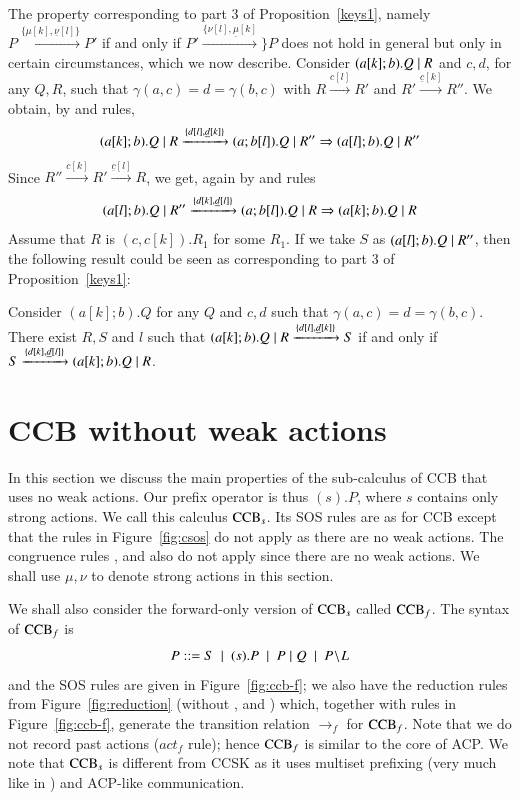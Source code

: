 The property corresponding to part 3 of Proposition~\ref{keys1},
namely $P \xrightarrow{\{\mu[k],\underline{\nu}[l]\}} P'$ if and only if
$P' \xrightarrow{\{\nu[l],\underline{\mu}[k]}\} P$
does not hold in general but only in 
certain circumstances, which we now describe. Consider $(a[k];b).Q \; \vert \; R$ and $c,d$, for any $Q, R$,
such that $\gamma(a,c)=d=\gamma(b,c)$ with
$R\xrightarrow{c[l]} R'$ and $R' \xrightarrow{\underline{c}[k]} R''$. We obtain, by  and  rules,
$$(a[k];b).Q \; \vert \; R \xrightarrow{\{d[l], \underline{d}[k]\}} (a;b[l]).Q \; \vert \; R'' \Rightarrow 
(a[l];b).Q \; \vert \; R''$$
Since $R'' \xrightarrow{c[k]} R' \xrightarrow{\underline{c}[l]}R$,
we get, again by  and  rules
$$(a[l];b).Q \; \vert \; R'' \xrightarrow{\{d[k], \underline{d}[l]\}} (a;b[l]).Q \; \vert \; R
  \Rightarrow (a[k];b).Q \; \vert \; R$$
Assume that $R$ is $(c,c[k]).R_1$ for some $R_1$. If we take $S$ as $(a[l];b).Q \; \vert \; R''$, then  
the following result could be seen as corresponding to part 3 of Proposition~\ref{keys1}:
\begin{proposition}
Consider $(a[k];b).Q$ for any $Q$ and $c,d$ such that $\gamma(a,c)=d=\gamma(b,c)$. There exist
$R,S$ and $l$ such that $(a[k];b).Q \; \vert \; R \xrightarrow{\{d[l], \underline{d}[k]\}} S$ if and only if
$S \xrightarrow{\{d[k], \underline{d}[l]\}} (a[k];b).Q \; \vert \; R$.
\end{proposition}

\section{CCB without weak actions}
In this section we discuss the main properties of the sub-calculus of CCB that uses 
no weak actions. Our prefix
operator is thus $(s).P$, where $s$ contains only strong actions. 
We call this calculus $\mbox{\rm CCB}_s$.  Its SOS rules are as for CCB except that 
the rules in Figure~\ref{fig:csos} do not apply as there are no weak actions. 
The congruence rules ,  and  also do not apply 
since there are no weak actions.
We shall use $\mu, \nu$ to denote strong actions in this section.

We shall also consider the forward-only version of $\mbox{\rm CCB}_s$
called $\mbox{\rm CCB}_f$. The syntax of $\mbox{\rm CCB}_f$
is $$P ::=   S \ \mid \ (s).P \ \mid \ P\paral Q \ \mid \ P\restrict L $$
and the SOS rules are given in Figure~\ref{fig:ccb-f};
we also have the reduction rules from Figure~\ref{fig:reduction} (without ,  
and ) which, together with rules
in Figure~\ref{fig:ccb-f}, generate the transition
relation $\xrightarrow{}_f$ for $\mbox{\rm CCB}_f$.
Note that we do not record past actions (\mbox{$act_f$} rule);
hence $\mbox{\rm CCB}_f$ is similar to the core of ACP. We note that $\mbox{\rm CCB}_s$ is different
from CCSK \cite{PhillipsUlidowski06,Irek2007} as it uses multiset prefixing (very much like in
\cite{Danos2007ccsr,Irek2012}) and ACP-like communication.

